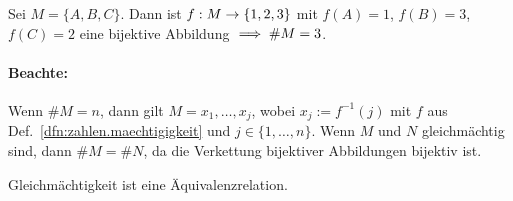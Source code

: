 \documentclass[12pt]{scrreprt}
\begin{document}
\begin{bsp*}
Sei $M = \{A, B, C\}$. Dann ist $f:M \rightarrow \{1,2,3\}$ mit 
$f(A) = 1$, $f(B)=3$, $f(C)=2$ eine bijektive Abbildung $\implies \#M = 3$.
\end{bsp*}
\paragraph{Beachte:} Wenn $\#M=n$, dann gilt $M = {x_1, \dotsc , x_j}$, wobei $x_j := f^{-1}(j)$ mit $f$
aus Def.~\ref{dfn:zahlen.maechtigigkeit} und $j \in \{1, \dotsc, n\}$. Wenn $M$ und $N$ gleichmächtig sind,
dann $\#M=\#N$, da die Verkettung bijektiver Abbildungen bijektiv ist.
\begin{bem*}Gleichmächtigkeit ist eine Äquivalenzrelation.\end{bem*}
\end{document}
